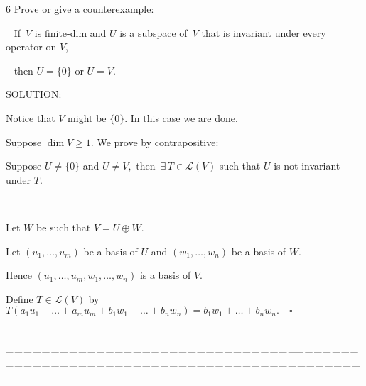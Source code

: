 \documentclass[a4paper, 11pt, UTF8]{article}
\def\Lm{\mathcal{L}}
\begin{document}
\begin{large}
{\timesbf\Large 6} {\timessl\Large 
Prove or give a counterexample:}\par\,\,\,
{\timessl\Large If \,$V$ is finite-dim and $U$ is a subspace of \,$V$ that is invariant under every operator on $V$,}\par\,\,\,
{\timessl\Large then $U = \{0\}$ or $U = V$.
}\par
{\timesbf S\footnotesize{OLUTION:}}\par\quad
Notice that $V$ might be $\{0\}$. In this case we are done.\par\quad
Suppose $\dim V\geq 1.$ We prove by contrapositive:\par\quad
Suppose $U\neq\{0\}$ and $U\neq V,$ then $\,\exists\,T\in\Lm(V)$ such that $U$ is not invariant under $T$.\par{\tiny\,\par}\quad
Let $W$ be such that $V=U\oplus W.$\par\quad
Let $(u_1,\dots,u_m)$ be a basis of $U$ and $(w_1,\dots,w_n)$ be a basis of $W.$\par\quad
Hence $(u_1,\dots,u_m,w_1,\dots,w_n)$ is a basis of $V$.\par\quad
Define $T\in\Lm(V)$ by $T(a_1 u_1+\dots+a_m u_m+b_1 w_1+\dots+b_n w_n)=b_1 w_1+\dots+b_n w_n.\quad\square$\par
{\tiny \_\,\_\,\_\,\_\,\_\,\_\,\_\,\_\,\_\,\_\,\_\,\_\,\_\,\_\,\_\,\_\,\_\,\_\,\_\,\_\,\_\,\_\,\_\,\_\,\_\,\_\,\_\,\_\,\_\,\_\,\_\,\_\,\_\,\_\,\_\,\_\,\_\,\_\,\_\,\_\,\_\,\_\,\_\,\_\,\_\,\_\,\_\,\_\,\_\,\_\,\_\,\_\,\_\,\_\,\_\,\_\,\_\,\_\,\_\,\_\,\_\,\_\,\_\,\_\,\_\,\_\,\_\,\_\,\_\,\_\,\_\_\,\_\,\_\,\_\,\_\,\_\,\_\,\_\,\_\,\_\,\_\,\_\,\_\,\_\,\_\,\_\,\_\,\_\,\_\,\_\,\_\,\_\,\_\,\_\,\_\,\_\,\_\,\_\,\_\,\_\,\_\,\_\,\_\,\_\,\_\,\_\,\_\,\_\,\_\,\_\,\_\,\_\,\_\,\_\,\_\,\_\,\_\,\_\,\_\,\_\,\_\,\_\,\_\,\_\,\_\,\_\,\_\,\_\,\_\,\_\,\_\,\_\,\_\,\_\,\_\,\_\,\_\,\_\,\_\,\_\,\_}\par


\end{large}
\end{document}
